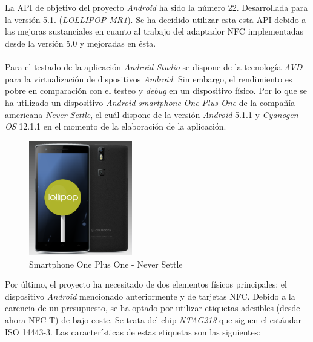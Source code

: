 \documentclass[../PFC.tex]{subfiles}
\begin{document}
\\\\
La API de objetivo del proyecto \textit{Android} ha sido la número 22. Desarrollada para la versión 5.1. (\textit{LOLLIPOP MR1}). Se ha decidido utilizar esta esta API debido a las mejoras sustanciales en cuanto al trabajo del adaptador NFC implementadas desde la versión 5.0\cite{androidAPI21} y mejoradas en ésta\cite{androidAPI22}. 
\\\\
Para el testado de la aplicación \textit{Android Studio} se dispone de la tecnología \textit{AVD} para la virtualización de dispositivos \textit{Android}. Sin embargo, el rendimiento es pobre en comparación con el testeo y \textit{debug} en un dispositivo físico. Por lo que se ha utilizado un dispositivo \textit{Android} \textit{smartphone} \textit{One Plus One} de la compañía americana \textit{Never Settle}, el cuál dispone de la versión \textit{Android} 5.1.1 y \textit{Cyanogen OS} 12.1.1  en el momento de la elaboración de la aplicación. 

\begin{figure}[H]
  \centering
  \includegraphics[width=0.4\textwidth]{./img/opo}
  \caption{Smartphone One Plus One - Never Settle}
  \label{img:opo}
\end{figure} 

Por último, el proyecto ha necesitado de dos elementos físicos principales: el dispositivo \textit{Android} mencionado anteriormente y de tarjetas NFC. Debido a la carencia de un presupuesto, se ha optado por utilizar etiquetas adesibles (desde ahora NFC-T) de bajo coste. Se trata del chip \textit{NTAG213} que siguen el estándar ISO 14443-3\cite{iso14443}. Las características de estas etiquetas son las siguientes:
\end{document}

